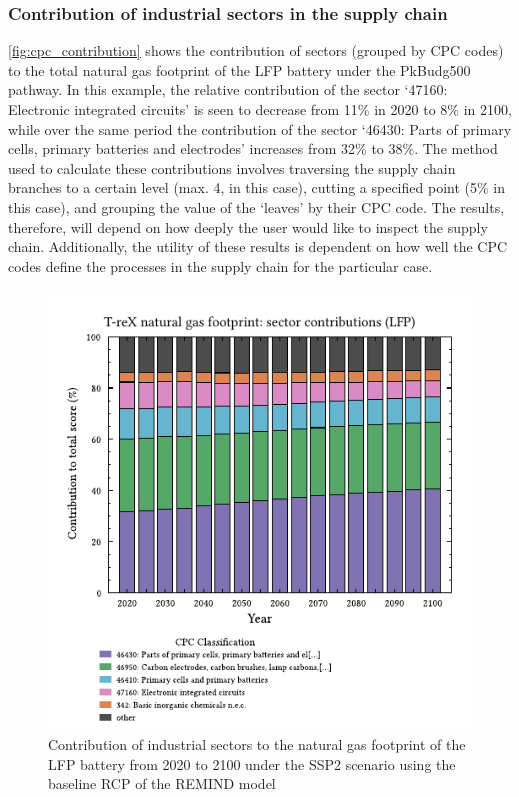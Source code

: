 \documentclass[a4paper,fleqn]{cas-dc}
\begin{document}
\subsubsection{Contribution of industrial sectors in the supply chain}\label{sec:results-case_study-topsectors}

\autoref{fig:cpc_contribution} shows the contribution of sectors (grouped by CPC codes) to the total natural gas footprint of the LFP battery under the PkBudg500 pathway. In this example, the relative contribution of the sector `47160: Electronic integrated circuits' is seen to decrease from 11\% in 2020 to 8\% in 2100, while over the same period the contribution of the sector `46430: Parts of primary cells, primary batteries and electrodes' increases from 32\% to 38\%. The method used to calculate these contributions involves traversing the supply chain branches to a certain level (max. 4, in this case), cutting a specified point (5\% in this case), and grouping the value of the `leaves' by their CPC code. The results, therefore, will depend on how deeply the user would like to inspect the supply chain. Additionally, the utility of these results is dependent on how well the CPC codes define the processes in the supply chain for the particular case.

\begin{figure}
	\centering
	\includegraphics[width=0.8\columnwidth]{figs/T-reX-wastefootprint-sectorcontributions.pdf}
	\caption{Contribution of industrial sectors to the natural gas footprint of the LFP battery from 2020 to 2100 under the SSP2 scenario using the baseline RCP of the REMIND model}\label{fig:cpc_contribution}
\end{figure} 
\end{document}
